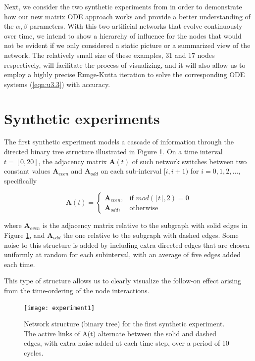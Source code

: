 Next, we consider the two synthetic experiments from \cite{grindrod2014dynamical} in order to demonstrate how our new matrix ODE approach works and provide a better understanding of the $\alpha,\beta$ parameters. With this two artificial networks that evolve continuously over time, we intend to show a hierarchy of influence for the nodes that would not be evident if we only considered a static picture or a summarized view of the network. The relatively small size of these examples, 31 and 17 nodes respectively, will facilitate the process of visualizing, and it will also allow us to employ a highly precise Runge-Kutta iteration to solve the corresponding ODE systems (\ref{eqn:u3.3}) with accuracy.

\section{Synthetic experiments}
\label{sec:synexp}
The first synthetic experiment models a cascade of information through the directed binary
tree structure illustrated in Figure \ref{fig:exp1}. On a time interval $t = [0, 20]$, the adjacency
matrix $\mathbf{A}(t)$ of such network switches between two constant values $\mathbf{A}_{even}$ and $\mathbf{A}_{odd}$ on each sub-interval $[i, i + 1)$ for $i=0,1,2,\dots$, specifically

\begin{equation*}
\mathbf{A}(t)=
    \begin{cases}
        \mathbf{A}_{even}, & \text{if } mod(\lfloor t \rfloor, 2) = 0\\
        \mathbf{A}_{odd}, & \text{otherwise} 
    \end{cases}
\end{equation*}

where $\mathbf{A}_{even}$ is the adjacency matrix relative to the subgraph with solid edges in Figure \ref{fig:exp1}, and $\mathbf{A}_{odd}$ the one relative to the subgraph with dashed edges. Some noise to this structure is added by including extra directed edges that are chosen uniformly at random for each subinterval, with an average of five edges added each time. 

This type of structure allows us to clearly visualize the follow-on effect arising from the time-ordering of the node interactions.

\begin{figure}[h]\centering
    \texttt{[image: experiment1]}
    \caption{Network structure (binary tree) for the first synthetic experiment. The active links of A(t) alternate between the solid and dashed edges, with extra noise added at each time step, over a period of 10 cycles.}
    \label{fig:exp1}
    \bigskip
\end{figure}

